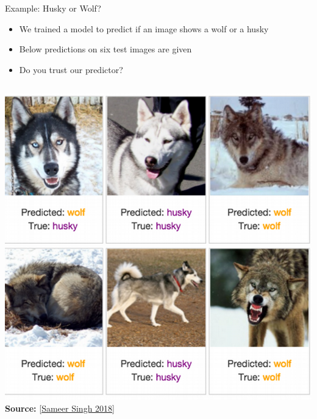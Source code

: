 \documentclass[10pt,compress,t,notes=noshow, xcolor=table]{beamer}
\begin{document}
\begin{frame}[t]{Example: Husky or Wolf?}
	\begin{itemize}
		\item We trained a model to predict if an image shows a wolf or a husky 
		\item Below predictions on six test images are given 
		\item Do you trust our predictor? 
	\end{itemize}
	
	\begin{columns}[T, onlytextwidth]
	
	\begin{column}{0.45\textwidth}
	    \centering
    		\includegraphics[width=\textwidth]{figure/lime-wolfhusky.png}\\
    		\includegraphics[width=\textwidth]{figure/lime-wolfhusky2.png}\\
    		{\textbf{Source:} [\href{http://www.facweb.iitkgp.ac.in/~niloy/COURSE/Spring2018/IntelligentSystem/PPT_2018/why_should_i_trust_ppt.pdf}{Sameer Singh 2018}]}
	    
	\end{column}
	

\end{columns}
\end{frame}
\end{document}
